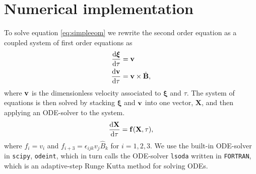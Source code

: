 \section{Numerical implementation}

To solve equation \ref{eq:simpleeom} we rewrite the second order equation as a coupled system of first order equations as
\begin{align}\label{eq:system}
	\frac{\text{d} \boldsymbol{\xi}}{\text{d} \tau} &= \mathbf{v} \\
	\frac{\text{d} \mathbf{v}}{\text{d} \tau} &=\mathbf{v} \times \hat{\mathbf{B}},
\end{align}
where $\mathbf{v}$ is the dimensionless velocity associated to $\boldsymbol{\xi}$ and $\tau$. The system of equations is then solved by stacking $\boldsymbol{\xi}$ and $\mathbf{v}$ into one vector, $\mathbf{X}$, and then applying an ODE-solver to the system.
\begin{equation}\label{eq:ODE}
	\frac{\text{d} \mathbf{X}}{\text{d} \tau} = \mathbf{f}(\mathbf{X},\tau),
\end{equation}
where $f_i = v_i$ and $f_{i+3} = \epsilon_{ijk} v_j \hat{B}_k $ for $i=1,2,3$. We use the built-in ODE-solver in \texttt{scipy}, \texttt{odeint}, which in turn calls the ODE-solver \texttt{lsoda} written in \texttt{FORTRAN}, which is an adaptive-step Runge Kutta method for solving ODEs.

\newpage